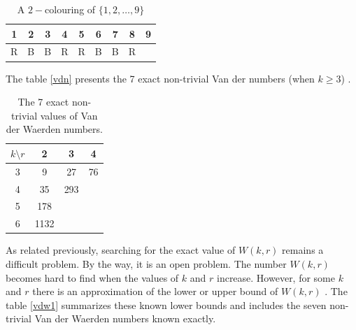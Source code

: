 \begin{table}[h]
\begin{center}
\begin{tabular}{ccccccccc}
\hline
1 & 2 & 3 & 4  & 5 & 6 & 7 & 8 & 9 \\ \hline
\color{red}R & \color{blue}B & \color{blue}B & \color{red}R & \color{red}R & \color{blue}B & \color{blue}B & \color{red}R  & \\
\hline 
\end{tabular} 
\end{center}
\caption{A $2-$colouring of $\{1,2,\ldots, 9\}$} \label{van23}
\end{table}

The table \eqref{vdn} presents the 7 exact non-trivial Van der numbers  (when $k\geq 3$) \citep{dransfield2004}.

\begin{table}[h]

\begin{center}
\begin{tabular}{|c|c|c|c|}
\hline 
$k \setminus r$ & 2 & 3 & 4  \\ 
\hline 
3 & 9 & 27 & 76  \\ 
\hline 
4 & 35 & 293 &   \\ 
\hline 
5 & 178 &  &   \\ 
\hline 
6 & 1132 &  &   \\ 
\hline 

\end{tabular}
\end{center}
\caption{The 7 exact non-trivial values of Van der Waerden numbers.} \label{vdn}
\end{table} 

As related previously, searching for the exact value of $W(k,r)$ remains a difficult problem. By the way, it is an open problem. The number $W(k,r)$ becomes hard to find when the values of $k$ and $r$ increase. However, for some $k$ and $r$ there is an approximation of the lower or upper bound of $W(k,r)$ \citep{stevens1978computer, herwig2007new, beeler1979some, dransfield2004, brown2008bounds, rabung2012, kouril2008van}. The table \eqref{vdw1} summarizes these known lower bounds and includes the seven non-trivial Van der Waerden numbers known exactly.

